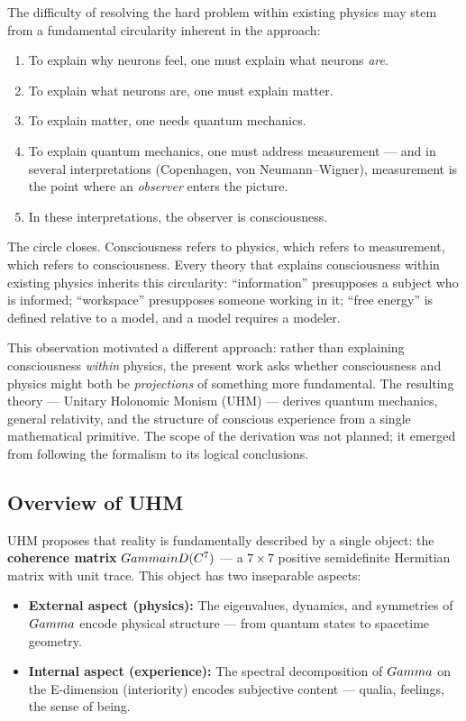 The difficulty of resolving the hard problem within existing physics may
stem from a fundamental circularity inherent in the approach:

\begin{enumerate}[leftmargin=2em]
  \item To explain why neurons feel, one must explain what neurons \emph{are}.
  \item To explain what neurons are, one must explain matter.
  \item To explain matter, one needs quantum mechanics.
  \item To explain quantum mechanics, one must address measurement --- and in several
        interpretations (Copenhagen, von Neumann--Wigner), measurement is the point where
        an \emph{observer} enters the picture.
  \item In these interpretations, the observer is consciousness.
\end{enumerate}

The circle closes. Consciousness refers to physics, which refers to measurement, which
refers to consciousness. Every theory that explains consciousness within existing physics
inherits this circularity: ``information'' presupposes a subject who is informed;
``workspace'' presupposes someone working in it; ``free energy'' is defined relative to a
model, and a model requires a modeler.

This observation motivated a different approach: rather than explaining
consciousness \emph{within} physics, the present work asks whether
consciousness and physics might both be \emph{projections} of something more
fundamental. The resulting theory --- Unitary Holonomic Monism (UHM) ---
derives quantum mechanics, general relativity, and the structure of conscious
experience from a single mathematical primitive. The scope of the derivation
was not planned; it emerged from following the formalism to its logical
conclusions.

\subsection{Overview of UHM}

UHM proposes that reality is fundamentally described by a single object: the
\textbf{coherence matrix} $Gamma in D(C^7)$ --- a $7 \times 7$ positive
semidefinite Hermitian matrix with unit trace. This object has two inseparable aspects:

\begin{itemize}[leftmargin=2em]
  \item \textbf{External aspect (physics):} The eigenvalues, dynamics, and symmetries of
        $Gamma$ encode physical structure --- from quantum states to spacetime geometry.
  \item \textbf{Internal aspect (experience):} The spectral decomposition of $Gamma$ on
        the E-dimension (interiority) encodes subjective content --- qualia, feelings,
        the sense of being.
\end{itemize}


